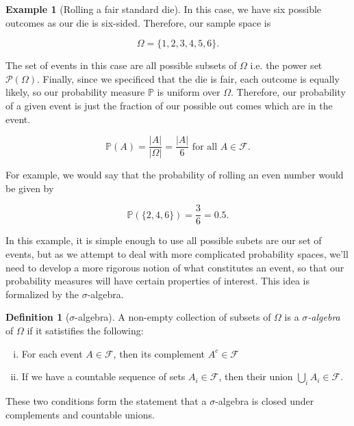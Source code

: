 \documentclass[12pt]{article}
\newcommand{\calF}{\mathcal{F}}
\newcommand{\Prob}{\mathbb{P}}
\newcommand{\abs}[1]{ \left| #1 \right| }
\theoremstyle{definition}
\newtheorem{defn}[thm]{Definition}
\newtheorem{exmp}[thm]{Example}
\theoremstyle{remark}
\numberwithin{equation}{section}
\begin{document}
 \begin{exmp}[Rolling a fair standard die]
 In this case, we have six possible outcomes as our die is six-sided. Therefore, our sample space is 

 \begin{equation}
   \Omega = \{ 1, 2, 3, 4, 5, 6 \}.
 \end{equation}

 The set of events in this case are all possible subsets of $\Omega$ i.e. the power set $\mathcal{P}(\Omega)$. Finally, since we specificed that the die is fair, each outcome is equally likely, so our probability measure $\Prob$ is uniform over $\Omega$. Therefore, our probability of a given event is just the fraction of our possible out comes which are in the event.

 \begin{equation}
 \Prob(A) = \frac{\abs{A}}{\abs{\Omega}} = \frac{\abs{A}}{6} \text{ for all  } A \in \calF.
 \end{equation}

 For example, we would say that the probability of rolling an even number would be given by

 \begin{equation}
   \Prob(\{ 2, 4, 6 \}) = \frac{3}{6} = 0.5.
 \end{equation}
 \end{exmp}

 In this example, it is simple enough to use all possible subets are our set of events, but as we attempt to deal with more complicated probability spaces, we'll need to develop a more rigorous notion of what constitutes an event, so that our probability measures will have certain properties of interest. This idea is formalized by the $\sigma$-algebra.

 \begin{defn}[$\sigma$-algebra]
   A non-empty collection of subsets of $\Omega$ is a \emph{$\sigma$-algebra} of $\Omega$ if it satistifies the following:

 \begin{enumerate}[(i)]
   \item For each event $A\in \calF$, then its complement $A^c\in \calF$
   \item If we have a countable sequence of sets $A_i \in \calF$, then their union $\bigcup_i A_i \in \calF$.
 \end{enumerate}

 These two conditions form the statement that a $\sigma$-algebra is closed under complements and countable unions.
 \end{defn}
\end{document}
